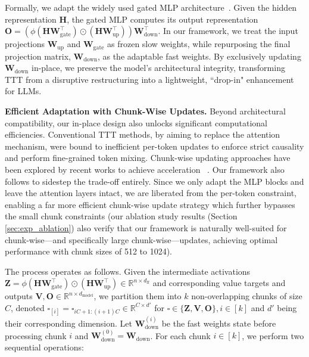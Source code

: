 Formally, we adapt the widely used gated MLP architecture~\citep{grattafiori2024llama,yang2025qwen3}. Given the hidden representation $\mathbf{H}$, the gated MLP computes its output representation $\mathbf{O}=\left(\phi(\mathbf{H}\mathbf{W}_{\mathrm{gate}}^\top)\odot(\mathbf{H}\mathbf{W}_{\mathrm{up}}^\top)\right)\mathbf{W}_{\mathrm{down}}^\top$. In our framework, we treat the input projections $\mathbf{W}_{\mathrm{up}}$ and $\mathbf{W}_{\mathrm{gate}}$ as frozen slow weights, while repurposing the final projection matrix, $\mathbf{W}_{\mathrm{down}}$, as the adaptable fast weights. By exclusively updating $\mathbf{W}_{\mathrm{down}}$ in-place, we preserve the model's architectural integrity, transforming TTT from a disruptive restructuring into a lightweight, ``drop-in" enhancement for LLMs. 

\textbf{Efficient Adaptation with Chunk-Wise Updates.} 
Beyond architectural compatibility, our in-place design also unlocks significant computational efficiencies. Conventional TTT methods, by aiming to replace the attention mechanism, were bound to inefficient per-token updates to enforce strict causality and perform fine-grained token mixing. Chunk-wise updating approaches have been explored by recent works to achieve acceleration ~\citep{li2025tnt,sun2023retentive,behrouz2024titans,irie2025fastweightprogramminglinear}. Our framework also follows to sidestep the trade-off entirely. Since we only adapt the MLP blocks and leave the attention layers intact, we are liberated from the per-token constraint, enabling a far more efficient chunk-wise update strategy which further bypasses the small chunk constraints (our ablation study results (Section \ref{sec:exp_ablation}) also verify that our framework is naturally well-suited for chunk-wise—and specifically large chunk-wise—updates, achieving optimal performance with chunk sizes of 512 to 1024).

The process operates as follows. Given the intermediate activations $\mathbf{Z}=\phi(\mathbf{H}\mathbf{W}_{\mathrm{gate}}^\top)\odot(\mathbf{H}\mathbf{W}_{\mathrm{up}}^\top)\in\mathbb{R}^{n\times d_{\mathrm{ff}}}$ and corresponding value targets and outputs $\mathbf{V},\mathbf{O}\in\mathbb{R}^{n\times d_{\mathrm{model}}}$, we partition them into $k$ non-overlapping chunks of size $C$, denoted $\mathbf{\square}_{[i]}=\mathbf{\square}_{iC+1:(i+1)C}\in\mathbb{R}^{C\times d'}$ for $\square\in\{\mathbf{Z},\mathbf{V},\mathbf{O}\}, i\in[k]$ and $d'$ being their corresponding dimension. Let $\mathbf{W}_{\mathrm{down}}^{(i)}$ be the fast weights state before processing chunk $i$ and $\mathbf{W}_{\mathrm{down}}^{(0)}=\mathbf{W}_{\mathrm{down}}$. For each chunk $i\in[k]$, we perform two sequential operations:


